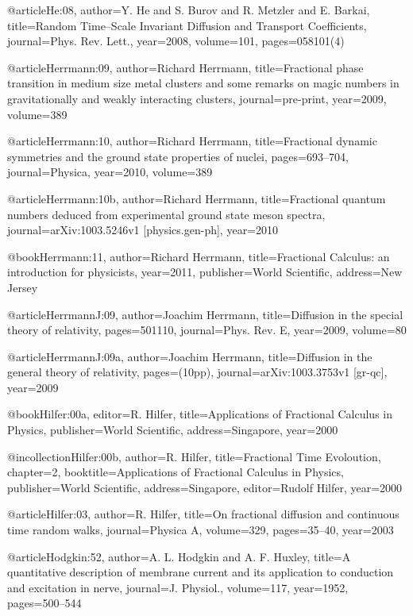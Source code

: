 \begin{thebibliography}{99}
@article{He:08,
  author={Y. He and S. Burov and R. Metzler and E. Barkai},
  title={Random Time--Scale Invariant Diffusion and Transport Coefficients},
  journal={Phys. Rev. Lett.},
  year={2008},
  volume={101},
  pages={058101(4)}
}

@article{Herrmann:09,
  author={Richard Herrmann},
  title={Fractional phase transition in medium size metal clusters and some remarks
    on magic numbers in gravitationally and weakly interacting clusters},
  journal={pre-print},
  year={2009},
  volume={389}
}

@article{Herrmann:10,
  author={Richard Herrmann},
  title={Fractional dynamic symmetries and the ground state properties of nuclei},
  pages={693--704},
  journal={Physica},
  year={2010},
  volume={389}
}

@article{Herrmann:10b,
  author={Richard Herrmann},
  title={Fractional quantum numbers deduced from experimental ground state meson
    spectra},
  journal={arXiv:1003.5246v1 [physics.gen-ph]},
  year={2010}
}

@book{Herrmann:11,
  author={Richard Herrmann},
  title={Fractional Calculus: an introduction for physicists},
  year={2011},
  publisher={World Scientific},
  address={New Jersey}
}

@article{HerrmannJ:09,
  author={Joachim Herrmann},
  title={Diffusion in the special theory of relativity},
  pages={501110},
  journal={Phys. Rev. E},
  year={2009},
  volume={80}
}

@article{HerrmannJ:09a,
  author={Joachim Herrmann},
  title={Diffusion in the general theory of relativity},
  pages={(10pp)},
  journal={arXiv:1003.3753v1 [gr-qc]},
  year={2009}
}

@book{Hilfer:00a,
  editor={R. Hilfer},
  title={Applications of Fractional Calculus in Physics},
  publisher={World Scientific},
  address={Singapore},
  year={2000}
}

@incollection{Hilfer:00b,
  author={R. Hilfer},
  title={Fractional Time Evoloution},
  chapter={2},
  booktitle={Applications of Fractional Calculus in Physics},
  publisher={World Scientific},
  address={Singapore},
  editor={Rudolf Hilfer},
  year={2000}
}

@article{Hilfer:03,
  author={R. Hilfer},
  title={On fractional diffusion and continuous time random walks},
  journal={Physica A},
  volume={329},
  pages={35--40},
  year={2003}
}

@article{Hodgkin:52,
  author={A. L. Hodgkin and A. F. Huxley},
  title={A quantitative description of membrane current and its application to
    conduction and excitation in nerve},
  journal={J. Physiol.},
  volume={117},
  year={1952},
  pages={500--544}
}


\end{thebibliography}
